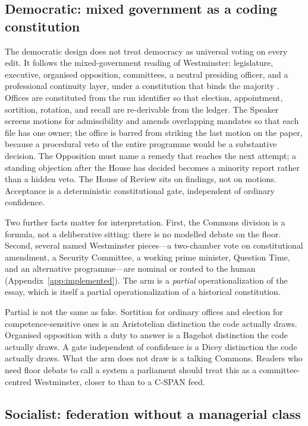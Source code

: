 \documentclass[11pt,a4paper]{article}
\begin{document}
\subsection{Democratic: mixed government as a coding constitution}

The democratic design does not treat democracy as universal voting on every edit. It
follows the mixed-government reading of Westminster: legislature, executive, organised
opposition, committees, a neutral presiding officer, and a professional continuity layer,
under a constitution that binds the majority \citep{bagehot1867,dicey1885,madison1788,montesquieu1748}.
Offices are constituted from the run identifier so that election, appointment, sortition,
rotation, and recall are re-derivable from the ledger. The Speaker screens motions for
admissibility and amends overlapping mandates so that each file has one owner; the office
is barred from striking the last motion on the paper, because a procedural veto of the
entire programme would be a substantive decision. The Opposition must name a remedy that
reaches the next attempt; a standing objection after the House has decided becomes a
minority report rather than a hidden veto. The House of Review sits on findings, not on
motions. Acceptance is a deterministic constitutional gate, independent of ordinary
confidence.

Two further facts matter for interpretation. First, the Commons division is a formula,
not a deliberative sitting: there is no modelled debate on the floor. Second, several
named Westminster pieces---a two-chamber vote on constitutional amendment, a Security
Committee, a working prime minister, Question Time, and an alternative programme---are
nominal or routed to the human (Appendix~\ref{app:implemented}). The arm is a
\emph{partial} operationalization of the essay, which is itself a partial
operationalization of a historical constitution.

Partial is not the same as fake. Sortition for ordinary offices and election for
competence-sensitive ones is an Aristotelian distinction the code actually draws.
Organised opposition with a duty to answer is a Bagehot distinction the code actually
draws. A gate independent of confidence is a Dicey distinction the code actually draws.
What the arm does not draw is a talking Commons. Readers who need floor debate to call
a system a parliament should treat this as a committee-centred Westminster, closer to
\citet{martin2011} than to a C-SPAN feed.

\subsection{Socialist: federation without a managerial class}
\end{document}
